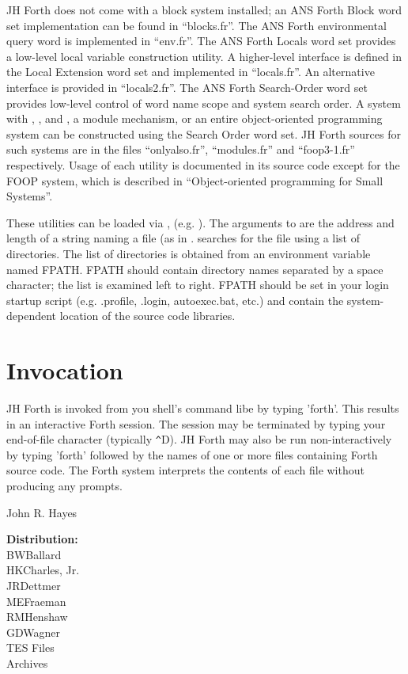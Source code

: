 JH Forth does not come with a block system installed;
an ANS Forth Block word set implementation can be found in ``blocks.fr''.
The ANS Forth environmental query word  is implemented
in ``env.fr''.
The ANS Forth Locals word set provides a low-level local variable
construction utility.  A higher-level interface is defined in the Local
Extension word set and implemented in ``locals.fr''.  An alternative
interface is provided in ``locals2.fr''.  
The ANS Forth Search-Order word set
provides low-level control of word name scope and system search order.
A  system with , ,
and , a module mechanism, or an entire
object-oriented programming system
can be constructed using the Search Order word set.  JH Forth
sources for such systems are in the files ``onlyalso.fr'', ``modules.fr''
and ``foop3-1.fr'' respectively.
Usage of each utility is documented in its source code except for
the FOOP system, which is described in
``Object-oriented programming for Small Systems''.

These utilities can be loaded via , (e.g. ).
The arguments to  are the address and length of a string
naming a file (as in .   searches for the file
using a list of directories.  The list of directories is obtained from
an environment variable named FPATH.  FPATH should contain directory
names separated by a space character; the list is examined left to right.
FPATH
should be set in your login startup script (e.g. .profile, .login,
autoexec.bat, etc.)
and contain the system-dependent location of the source code libraries.

\section{Invocation}
JH Forth is invoked from you shell's command libe by typing 'forth'.
This results in an interactive Forth session.  The session may be
terminated by typing your end-of-file character (typically \verb|^|D).  JH
Forth may also be run non-interactively by typing 'forth' followed
by the names of one or more files containing Forth source code.
The Forth system interprets the contents of each file without producing
any prompts.

\vspace{1in}
\hspace{4in}John R. Hayes

\begin{flushleft}
{\bf Distribution:} \\
BWBallard \\
HKCharles, Jr. \\
JRDettmer \\
MEFraeman \\
RMHenshaw \\
GDWagner \\
TES Files \\
Archives \\
\end{flushleft}

